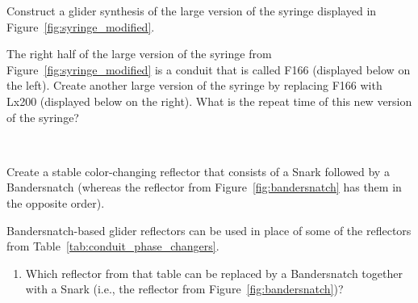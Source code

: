 \begin{multicols}{2}
	
	\mfilbreak
	
	
	\begin{problem}\label{exer:syringe_glider_synth} 
		Construct a glider synthesis of the large version of the syringe displayed in Figure~\ref{fig:syringe_modified}.
	\end{problem}
	
	
	\mfilbreak
	
	
	\begin{problemstar}\label{exer:syringe_Lx200} 
		The right half of the large version of the syringe from Figure~\ref{fig:syringe_modified} is a conduit that is called F166 (displayed below on the left). Create another large version of the syringe by replacing F166 with Lx200 (displayed below on the right). What is the repeat time of this new version of the syringe?
		
		\begin{center}
			~\quad~
		\end{center}
	
		
	\end{problemstar}


	\mfilbreak
	
	
	\begin{problem}\label{exer:bandersnatch_snark_other_side} 
		Create a stable color-changing reflector that consists of a Snark followed by a Bandersnatch (whereas the reflector from Figure~\ref{fig:bandersnatch} has them in the opposite order).
	\end{problem}


	\mfilbreak
	
	
	\begin{problem}\label{exer:bandersnatch_reflector_timing} 
		Bandersnatch-based glider reflectors can be used in place of some of the reflectors from Table~\ref{tab:conduit_phase_changers}.\smallskip
		
		\begin{enumerate}[label=\bf\color{ocre}(\alph*)]
			\item Which reflector from that table can be replaced by a Bandersnatch together with a Snark (i.e., the reflector from Figure~\ref{fig:bandersnatch})?
			

\end{enumerate}
\end{problem}
\end{multicols}
